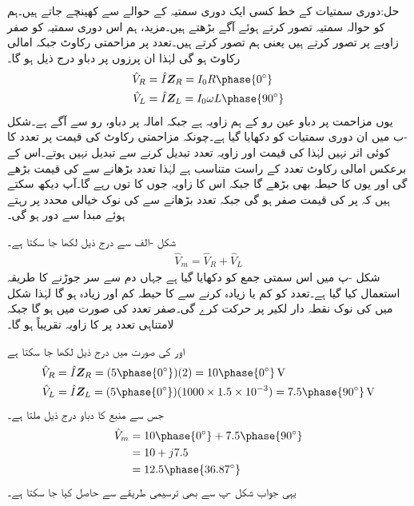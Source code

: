 حل:دوری سمتیات کے خط کسی ایک دوری سمتیہ کے حوالے سے کھینچے جاتے ہیں۔ہم  کو حوالہ سمتیہ تصور کرتے ہوئے آگے بڑھتے ہیں۔مزید، ہم اس دوری سمتیہ کو صفر زاویے پر تصور کرتے ہیں یعنی ہم  تصور کرتے ہیں۔تعدد  پر مزاحمتی رکاوٹ  جبکہ  امالی رکاوٹ  ہو گی لہٰذا ان پرزوں پر دباو درج ذیل ہو گا۔
\begin{align*}
\hat{V}_R&=\hat{I} \bZ_R=I_0 R \phase{0^{\circ}}\\
\hat{V}_L&=\hat{I} \bZ_L=I_0 \omega L \phase{90^{\circ}}
\end{align*}
یوں مزاحمت پر دباو عین رو کے ہم زاویہ ہے جبکہ امالہ پر دباو، رو سے  آگے ہے۔شکل -ب میں ان دوری سمتیات کو دکھایا گیا ہے۔چونکہ مزاحمتی رکاوٹ کی قیمت پر تعدد کا کوئی اثر نہیں لہٰذا  کی قیمت اور زاویہ تعدد تبدیل کرنے سے تبدیل نہیں ہوتے۔اس کے برعکس امالی رکاوٹ تعدد کے راست متناسب ہے لہٰذا تعدد بڑھانے سے  کی قیمت بڑھے گی اور یوں  کا حیطہ بھی بڑھے گا جبکہ اس کا زاویہ جوں کا توں رہے گا۔آپ دیکھ سکتے ہیں کہ  پر  کی قیمت صفر ہو گی جبکہ تعدد بڑھانے سے  کی نوک خیالی محدد پر رہتے ہوئے  مبدا سے دور ہو گی۔

شکل -الف سے درج ذیل لکھا جا سکتا ہے۔
\begin{align*}
\hat{V}_m=\hat{V}_R+\hat{V}_L
\end{align*}
شکل -پ میں اس سمتی جمع کو دکھایا گیا ہے جہاں دم سے سر جوڑنے کا طریقہ استعمال کیا گیا ہے۔تعدد کو کم یا زیادہ کرنے  سے  کا حیطہ کم اور زیادہ ہو گا لہٰذا شکل میں  کی نوک نقطہ دار لکیر پر حرکت کرے گی۔صفر تعدد کی صورت میں  ہو گا جبکہ لامتناہی  تعدد پر  کا زاویہ تقریباً  ہو گا۔
 
 اور  کی صورت میں درج ذیل لکھا جا سکتا ہے
\begin{align*}
\hat{V}_R&=\hat{I} \bZ_R=(5\phase{0^{\circ}})(2)=10\phase{0^{\circ}} \, \si{\volt}\\
\hat{V}_L&=\hat{I} \bZ_L=(5\phase{0^{\circ}})(1000 \times 1.5\times 10^{-3})=7.5\phase{90^{\circ}}\, \si{\volt}
\end{align*}
جس سے منبع کا دباو درج ذیل ملتا ہے۔
\begin{align*}
\hat{V}_m&=10\phase{0^{\circ}}+7.5\phase{90^{\circ}}\\
&=10+j7.5\\
&=12.5\phase{36.87^{\circ}}
\end{align*}
یہی جواب شکل -پ سے  بھی ترسیمی طریقے سے حاصل کیا جا سکتا ہے۔

